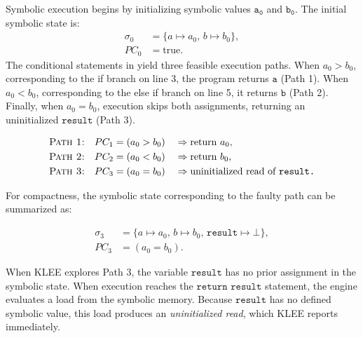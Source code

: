 Symbolic execution begins by initializing symbolic values $\mathtt{a_0}$ and $\mathtt{b_0}$. 
The initial symbolic state is:
\[
\begin{aligned}
	\sigma_0 &= \{ a \mapsto a_0,\, b \mapsto b_0 \},\\
	PC_0 &= \text{true}.
\end{aligned}
\]
The conditional statements in  yield three feasible execution paths.
When $a_0 > b_0$, corresponding to the if branch on line 3, the program returns $\mathtt{a}$ (Path 1).
When $a_0 < b_0$, corresponding to the else if branch on line 5, it returns $\mathtt{b}$ (Path 2).
Finally, when $a_0 = b_0$, execution skips both assignments, returning an uninitialized $\mathtt{result}$ (Path 3).

\setlength{\jot}{0.3em}
\[
\begin{aligned}
	\textsc{Path 1:}\quad &PC_1 = (a_0 > b_0) &&\Rightarrow \text{return } a_0,\\
	\textsc{Path 2:}\quad &PC_{2} = (a_0 < b_0) &&\Rightarrow \text{return } b_0,\\
	\textsc{Path 3:}\quad &PC_{3} = (a_0 = b_0) &&\Rightarrow \text{uninitialized read of } \texttt{result.}
\end{aligned}
\]

For compactness, the symbolic state corresponding to the faulty path can be summarized as:
\begin{tcolorbox}[
	title=Symbolic state on Path 3,
	colback=gray!3,
	colframe=blue!40!black,
	boxrule=0.3pt,
	left=4pt, right=4pt, top=2pt, bottom=1pt,
	sharp corners
	]
	$$
	\begin{aligned}
		\sigma_{3} &= \{ a \mapsto a_0,\, b \mapsto b_0,\, \texttt{result} \mapsto \bot \},\\
		PC_{3} &= (a_0 = b_0).
	\end{aligned}
	$$
	\vspace{1pt}
\end{tcolorbox}

When KLEE explores Path 3, the variable $\mathtt{result}$ has no prior assignment in the symbolic state.
When execution reaches the $\texttt{return result}$ statement, the engine evaluates a load from the symbolic memory.
Because $\mathtt{result}$ has no defined symbolic value, this load produces an \emph{uninitialized read}, which KLEE reports immediately.

